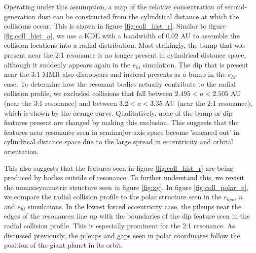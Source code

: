 \documentclass[onecolumn]{aastex63}
\begin{document}
Operating under this assumption, a map of the relative concentration of second-generation dust can be constructed from the cylindrical 
distance at which the collisions occur. This is shown in figure \ref{fig:coll_hist_r}. Similar to figure \ref{fig:coll_hist_a}, we use a KDE with a bandwidth of 0.02 AU to assemble the collision locations into a radial distribution. Most strikingly, the bump that was present near the 2:1 resonance is no longer present in cylindrical distance space, although it suddenly appears again in the $e_{hi}$ simulation. The dip that is present near the 3:1 MMR also disappears and instead presents as a bump in the $e_{hi}$ case. To determine how the resonant bodies actually contribute to the radial collision profile, we excluded collisions that fall between $2.495 < a < 2.505$ AU (near the 3:1 resonance) and between $3.2 < a < 3.35$ AU (near the 2:1 resonance), which is shown by the orange curve. Qualitatively, none of the bump or dip features present are changed by making this exclusion. This suggests that the features near resonance seen in semimajor axis space become 'smeared out' in cylindrical distance space due to the large spread in eccentricity and orbital orientation.

This also suggests that the features seen in figure \ref{fig:coll_hist_r} are being produced by bodies outside of resonance. To further understand this, we revisit the nonaxisymmetric structure seen in figure \ref{fig:xy}. In figure \ref{fig:coll_polar_e}, we compare the radial collision profile to the polar structure seen in the $e_{low}$, $n$ and $e_{hi}$ simulations. In the lowest forced eccentricity case, the pileups near the edges of the resonances line up with the boundaries of the dip feature seen in the radial collision profile. This is especially prominent for the 2:1 resonance. As discussed previously, the pileups and gaps seen in polar coordinates follow the position of the giant planet in its orbit.
\end{document}
